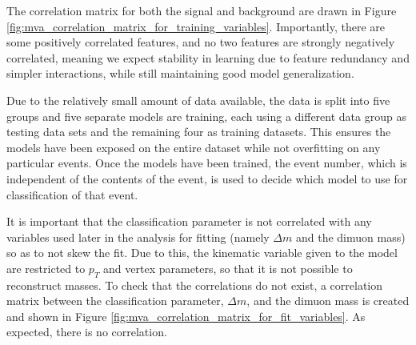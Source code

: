 The correlation matrix for both the signal and background are drawn in Figure \ref{fig:mva_correlation_matrix_for_training_variables}. Importantly, there are some positively correlated features, and no two features are strongly negatively correlated, meaning we expect stability in learning due to feature redundancy and simpler interactions, while still maintaining good model generalization.

Due to the relatively small amount of data available, the data is split into five groups and five separate models are training, each using a different data group as testing data sets and the remaining four as training datasets. This ensures the models have been exposed on the entire dataset while not overfitting on any particular events. Once the models have been trained, the event number, which is independent of the contents of the event, is used to decide which model to use for classification of that event. 

It is important that the classification parameter is not correlated with any variables used later in the analysis for fitting (namely $\Delta m$ and the dimuon mass) so as to not skew the fit. Due to this, the kinematic variable given to the model are restricted to $p_T$ and vertex parameters, so that it is not possible to reconstruct masses. To check that the correlations do not exist, a correlation matrix between the classification parameter, $\Delta m$, and the dimuon mass is created and shown in Figure \ref{fig:mva_correlation_matrix_for_fit_variables}. As expected, there is no correlation.


